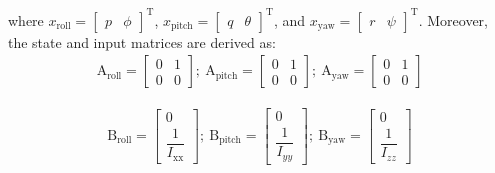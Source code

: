 \documentclass[conference]{IEEEtran}
\begin{document}
where $x_{\text{roll}} = \begin{bmatrix}
	p & \phi
\end{bmatrix}^\mathrm{T}$, $x_{\text{pitch}} = \begin{bmatrix}
	q & \theta \end{bmatrix}^\mathrm{T}$, and $x_{\text{yaw}} = \begin{bmatrix}
	r & \psi
\end{bmatrix}^\mathrm{T}$.
Moreover, the state and input matrices are derived as:
\begin{equation}
	\begin{split}
		\boldsymbol{\mathrm{A}}_{\text{roll}}  = \begin{bmatrix}
			0 & 1
			\\
			0 & 0
		\end{bmatrix};~ \boldsymbol{\mathrm{A}}_{\text{pitch}}  = \begin{bmatrix}
			0 & 1\\
			0 & 0
		\end{bmatrix};~ \boldsymbol{\mathrm{A}}_{\text{yaw}}  = \begin{bmatrix}
			0 & 1\\
			0 & 0
		\end{bmatrix}
	\end{split}
\end{equation}

\begin{equation}
	\begin{split}
		\boldsymbol{\mathrm{B}}_{\text{roll}}  = \begin{bmatrix}
			0
			\\[1em]
			\dfrac{1}{I_{\text{xx}}}
		\end{bmatrix};~ \boldsymbol{\mathrm{B}}_{\text{pitch}}  = \begin{bmatrix}
			0
			\\[1em]
			\dfrac{1}{I_{yy}}
		\end{bmatrix};~ \boldsymbol{\mathrm{B}}_{\text{yaw}}  = \begin{bmatrix}
			0
			\\[1em]
			\dfrac{1}{I_{zz}}
		\end{bmatrix}
	\end{split}
\end{equation}
\end{document}
